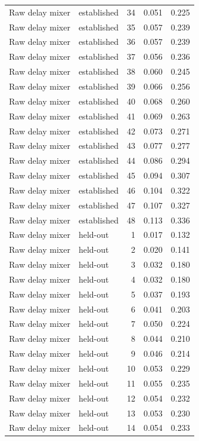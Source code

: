 \begin{tabular}{llrrr}
Raw delay mixer & established & 34 & 0.051 & 0.225 \\
Raw delay mixer & established & 35 & 0.057 & 0.239 \\
Raw delay mixer & established & 36 & 0.057 & 0.239 \\
Raw delay mixer & established & 37 & 0.056 & 0.236 \\
Raw delay mixer & established & 38 & 0.060 & 0.245 \\
Raw delay mixer & established & 39 & 0.066 & 0.256 \\
Raw delay mixer & established & 40 & 0.068 & 0.260 \\
Raw delay mixer & established & 41 & 0.069 & 0.263 \\
Raw delay mixer & established & 42 & 0.073 & 0.271 \\
Raw delay mixer & established & 43 & 0.077 & 0.277 \\
Raw delay mixer & established & 44 & 0.086 & 0.294 \\
Raw delay mixer & established & 45 & 0.094 & 0.307 \\
Raw delay mixer & established & 46 & 0.104 & 0.322 \\
Raw delay mixer & established & 47 & 0.107 & 0.327 \\
Raw delay mixer & established & 48 & 0.113 & 0.336 \\
Raw delay mixer & held-out & 1 & 0.017 & 0.132 \\
Raw delay mixer & held-out & 2 & 0.020 & 0.141 \\
Raw delay mixer & held-out & 3 & 0.032 & 0.180 \\
Raw delay mixer & held-out & 4 & 0.032 & 0.180 \\
Raw delay mixer & held-out & 5 & 0.037 & 0.193 \\
Raw delay mixer & held-out & 6 & 0.041 & 0.203 \\
Raw delay mixer & held-out & 7 & 0.050 & 0.224 \\
Raw delay mixer & held-out & 8 & 0.044 & 0.210 \\
Raw delay mixer & held-out & 9 & 0.046 & 0.214 \\
Raw delay mixer & held-out & 10 & 0.053 & 0.229 \\
Raw delay mixer & held-out & 11 & 0.055 & 0.235 \\
Raw delay mixer & held-out & 12 & 0.054 & 0.232 \\
Raw delay mixer & held-out & 13 & 0.053 & 0.230 \\
Raw delay mixer & held-out & 14 & 0.054 & 0.233 \\

\end{tabular}
